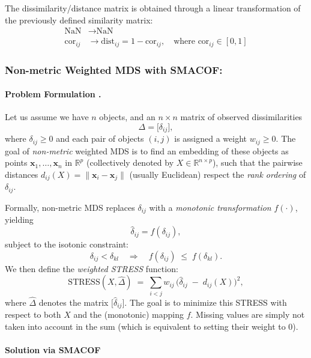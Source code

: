 \begin{remark}
    The dissimilarity/distance matrix is obtained through a linear transformation of the previously defined similarity matrix:
    \begin{align*}
        \text{NaN} &\rightarrow \text{NaN} \\
        \text{cor}_{ij} &\rightarrow \text{dist}_{ij} = 1-\text{cor}_{ij}, \quad \text{where } \text{cor}_{ij} \in [0,1]
    \end{align*}
\end{remark}


\subsubsection*{Non-metric Weighted MDS with SMACOF:}
\paragraph{Problem Formulation .} Let us assume we have $n$ objects, and an $n\times n$ matrix of observed dissimilarities 
\[
\Delta = \bigl[\delta_{ij}\bigr],
\]
where $\delta_{ij} \ge 0$ and each pair of objects $(i,j)$ is assigned a weight $w_{ij}\ge 0$. The goal of \emph{non-metric} weighted MDS is to find an embedding of these objects as points $\mathbf{x}_1,\dots,\mathbf{x}_n$ in $\mathbb{R}^p$ (collectively denoted by $X \in \mathbb{R}^{n\times p}$), such that the pairwise distances $d_{ij}(X) = \|\mathbf{x}_i - \mathbf{x}_j\|$ (usually Euclidean) respect the \emph{rank ordering} of $\delta_{ij}$.

Formally, non-metric MDS replaces $\delta_{ij}$ with a \emph{monotonic transformation} $f(\cdot)$, yielding
\[
\hat{\delta}_{ij} = f(\delta_{ij}),
\]
subject to the isotonic constraint:
\[
\delta_{ij} < \delta_{kl} 
\quad \Longrightarrow \quad 
f(\delta_{ij}) \;\le\; f(\delta_{kl}).
\]
We then define the \emph{weighted STRESS} function:
\begin{equation}
\mathrm{STRESS}(X,\hat{\Delta}) 
\;=\;
\sum_{i<j} w_{ij}\,\bigl(\hat{\delta}_{ij} \;-\; d_{ij}(X)\bigr)^2,
\label{eq:stress}
\end{equation}
where $\hat{\Delta}$ denotes the matrix $\bigl[\hat{\delta}_{ij}\bigr]$.  
The goal is to minimize this STRESS with respect to both $X$ and the (monotonic) mapping $f$. Missing values are simply not taken into account in the sum (which is equivalent to setting their weight to 0).

\paragraph{Solution via SMACOF}\label{sec:smacof-solution}

